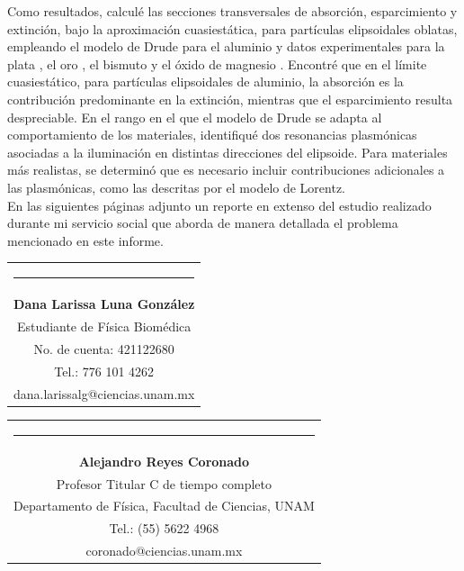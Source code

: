 \documentclass[9pt,letterpaper]{article}
\begin{document}
Como resultados, calculé las secciones transversales de absorción, esparcimiento y extinción, bajo la aproximación cuasiestática, para partículas elipsoidales oblatas, empleando el modelo de Drude para el aluminio \cite{Plasmonics} y datos experimentales para la plata \cite{Plata}, el oro \cite{Plata}, el bismuto \cite{Bismuto} y el óxido de magnesio \cite{MgO}. Encontré que en el límite cuasiestático, para partículas elipsoidales de aluminio, la absorción es la contribución predominante en la extinción, mientras que el esparcimiento resulta despreciable. En el rango en el que el modelo de Drude se adapta al comportamiento de los materiales, identifiqué dos resonancias plasmónicas asociadas a
la iluminación en distintas direcciones del elipsoide. Para materiales más realistas, se determinó que es necesario incluir contribuciones adicionales a las plasmónicas, como las descritas por el modelo de Lorentz. \\

En las siguientes páginas adjunto un reporte en extenso del estudio realizado durante mi servicio social que aborda de manera detallada el problema mencionado en este informe.	\\

\bigskip

	{\vspace{2.55cm}\begin{tabular} { c}
			\setlength{\tabcolsep}{15pt}
			\renewcommand{\arraystretch}{1}
			\noindent\rule{5.5cm}{0.4pt}\qquad \\
			
			\qquad  \textbf{Dana Larissa Luna González} \qquad \\
			\qquad Estudiante de Física Biomédica  \qquad \\ \qquad 
			No. de cuenta: 421122680\qquad \\  
			\qquad  Tel.: 776 101 4262 \qquad \\
			\qquad dana.larissalg@ciencias.unam.mx \qquad \\
			
		\end{tabular}
	}
	
	{\vspace{-2.53cm}\hspace{7cm}\begin{tabular} { c}
			\setlength{\tabcolsep}{15pt}
			\renewcommand{\arraystretch}{1}
			\noindent\rule{5.5cm}{0.4pt}\qquad \\
			
			\qquad  \textbf{Alejandro Reyes Coronado} \qquad \\
			\qquad Profesor Titular C de tiempo completo  \qquad \\  
			\qquad Departamento de Física, Facultad de Ciencias, UNAM\qquad \\ 
			\qquad  Tel.: (55) 5622 4968 \qquad \\
			\qquad coronado@ciencias.unam.mx \qquad \\
			
		\end{tabular}
		
	}
	
\end{document}
